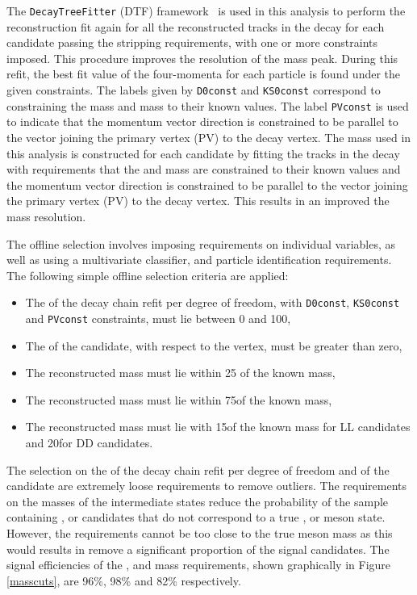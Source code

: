 The {\tt DecayTreeFitter} (DTF) framework~\cite{Hulsbergen:2005pu} is used in this analysis to perform the reconstruction fit again for all the reconstructed tracks in the decay for each \Bm candidate passing the stripping requirements, with one or more constraints imposed. This procedure improves the resolution of the \Bm mass peak. During this refit, the best fit value of the four-momenta for each particle is found under the given constraints. The labels given by {\tt D0const} and {\tt KS0const} correspond to constraining the \Dz mass and \KS mass to their known values. The label {\tt PVconst} is used to indicate that the \Bm momentum vector direction is constrained to be parallel to the vector joining the primary vertex (PV) to the \Bm decay vertex. The \Bm mass used in this analysis is constructed for each \Bm candidate by fitting the tracks in the decay with requirements that the \Dz and \KS mass are constrained to their known values and the \Bm momentum vector direction is constrained to be parallel to the vector joining the primary vertex (PV) to the \Bm decay vertex. This results in an improved the \Bm mass resolution.

The offline selection involves imposing requirements on individual variables, as well as using a multivariate classifier, and particle identification requirements. The following simple offline selection criteria are applied:

\begin{itemize}
\item The \chisq of the decay chain refit per degree of freedom, with {\tt D0const}, {\tt KS0const} and {\tt PVconst} constraints, must lie between 0 and 100, 
\item The \chisqip of the \Bm candidate, with respect to the \Bm vertex, must be greater than zero, 
\item The reconstructed \Dz mass must lie within 25 \mev of the known \Dz mass, 
\item The reconstructed \Kstarm mass must lie within 75\mev of the known \Kstarm mass, 
\item The reconstructed \KS mass must lie with 15\mev of the known \KS mass for LL candidates and 20\mev for DD candidates.
\end{itemize}

The selection on the \chisq of the decay chain refit per degree of freedom and \chisqip of the \Bm candidate are extremely loose requirements to remove outliers. The requirements on the masses of the intermediate states reduce the probability of the sample containing \Dz, \KS or \Kstar candidates that do not correspond to a true \Dz, \KS or \Kstar meson state. However, the requirements cannot be too close to the true meson mass as this would results in remove a significant proportion of the signal candidates. The signal efficiencies of the \Dz, \KS and \Kstar mass requirements, shown graphically in Figure \ref{masscuts}, are 96\%, 98\% and 82\% respectively. 

